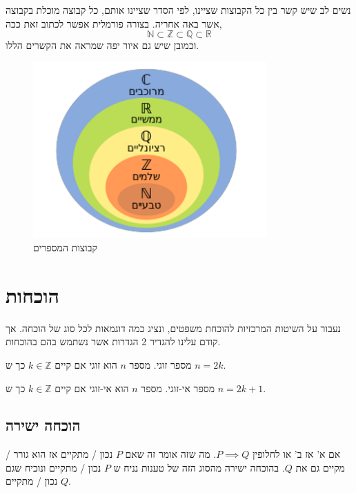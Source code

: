\documentclass[a4paper,12pt]{article}
\begin{document}
\begin{RTL}
\begin{remark}
נשים לב שיש קשר בין כל הקבוצות שציינו, לפי הסדר שציינו אותם, כל קבוצה מוכלת בקבוצה אשר באה אחריה. בצורה פורמלית אפשר לכתוב זאת ככה,
$$
\mathbb{N} \subset \mathbb{Z} \subset \mathbb{Q} \subset \mathbb{R}
$$
וכמובן שיש גם איור יפה שמראה את הקשרים הללו.
\begin{figure}[H]
  \centering
  \includegraphics[width=0.8\textwidth]{figures/sets.png}
  \caption{קבוצות המספרים}
  \label{fig:number_sets}
\end{figure}
\end{remark}


\newpage

\section{הוכחות}
נעבור על השיטות המרכזיות להוכחת משפטים, ונציג כמה דוגמאות לכל סוג של הוכחה.
אך קודם עלינו להגדיר 2 הגדרות אשר נשתמש בהם בהוכחות.

\begin{definition}
מספר זוגי. מספר $n$ הוא זוגי אם קיים $k \in \mathbb{Z}$ כך ש $n = 2k$.
\end{definition}

\begin{definition}
מספר אי-זוגי. מספר $n$ הוא אי-זוגי אם קיים $k \in \mathbb{Z}$ כך ש $n = 2k + 1$.
\end{definition}

\subsection{הוכחה ישירה}
אם א' אז ב' או לחלופין $P \implies Q$. מה שזה אומר זה שאם $P$ נכון / מתקיים אז הוא גורר / מקיים גם את $Q$. בהוכחה ישירה מהסוג הזה של טענות נניח ש $P$ נכון / מתקיים ונוכיח שגם $Q$ נכון / מתקיים.


\end{RTL}
\end{document}
